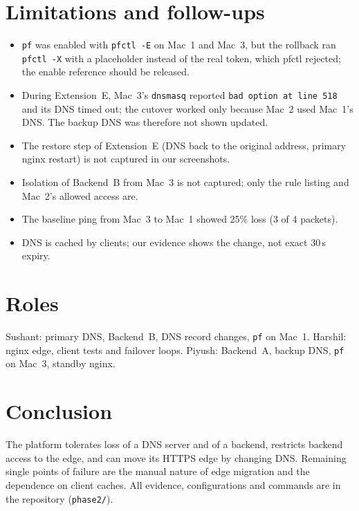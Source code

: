 \documentclass[11pt,a4paper]{article}
\begin{document}
\section{Limitations and follow-ups}\label{sec:lim}
\begin{itemize}[nosep]
\item \texttt{pf} was enabled with \texttt{pfctl -E} on Mac~1 and Mac~3, but the rollback ran \texttt{pfctl -X} with a placeholder instead of the real token, which pfctl rejected; the enable reference should be released.
\item During Extension~E, Mac~3's \texttt{dnsmasq} reported \texttt{bad option at line 518} and its DNS timed out; the cutover worked only because Mac~2 used Mac~1's DNS. The backup DNS was therefore not shown updated.
\item The restore step of Extension~E (DNS back to the original address, primary nginx restart) is not captured in our screenshots.
\item Isolation of Backend~B from Mac~3 is not captured; only the rule listing and Mac~2's allowed access are.
\item The baseline ping from Mac~3 to Mac~1 showed 25\% loss (3 of 4 packets).
\item DNS is cached by clients; our evidence shows the change, not exact 30\,s expiry.
\end{itemize}

\section{Roles}
Sushant: primary DNS, Backend~B, DNS record changes, \texttt{pf} on Mac~1. Harshil: nginx edge, client tests and failover loops. Piyush: Backend~A, backup DNS, \texttt{pf} on Mac~3, standby nginx.

\section{Conclusion}
The platform tolerates loss of a DNS server and of a backend, restricts backend access to the edge, and can move its HTTPS edge by changing DNS. Remaining single points of failure are the manual nature of edge migration and the dependence on client caches. All evidence, configurations and commands are in the repository (\texttt{phase2/}).
\end{document}
